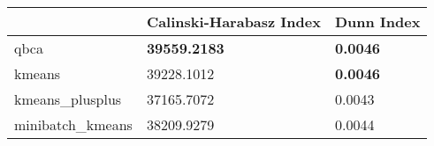 \begin{table}[htbp]
\centering
\begin{tabular}{lll}
\toprule
 & Calinski-Harabasz Index & Dunn Index \\
\midrule
qbca & \textbf{39559.2183} & \textbf{0.0046} \\
kmeans & 39228.1012 & \textbf{0.0046} \\
kmeans_plusplus & 37165.7072 & 0.0043 \\
minibatch_kmeans & 38209.9279 & 0.0044 \\
\bottomrule
\end{tabular}
\end{table}

